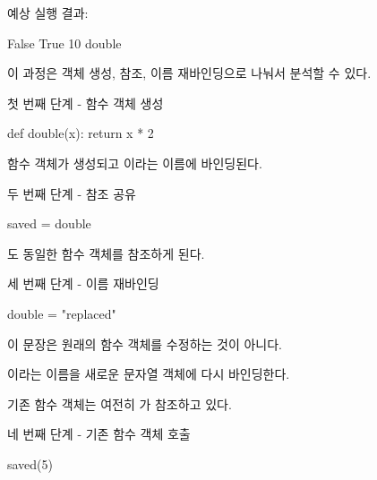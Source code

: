 예상 실행 결과:

\begin{dhkzsh}
False
True
10
double
\end{dhkzsh}

이 과정은 객체 생성, 참조, 이름 재바인딩으로 나눠서 분석할 수 있다.

\begin{dhknote}
\begin{dhksmry}[centered]
첫 번째 단계 - 함수 객체 생성
\end{dhksmry}
\end{dhknote}

\begin{dhkcode}
def double(x):
    return x * 2
\end{dhkcode}

함수 객체가 생성되고 이라는 이름에 바인딩된다.

\begin{dhknote}
\begin{dhksmry}[centered]
두 번째 단계 - 참조 공유
\end{dhksmry}
\end{dhknote}

\begin{dhkcode}
saved = double
\end{dhkcode}

도 동일한 함수 객체를 참조하게 된다.

\begin{dhknote}
\begin{dhksmry}[centered]
세 번째 단계 - 이름 재바인딩
\end{dhksmry}
\end{dhknote}

\begin{dhkcode}
double = "replaced"
\end{dhkcode}

이 문장은 원래의 함수 객체를 수정하는 것이 아니다.

이라는 이름을 새로운 문자열 객체에 다시 바인딩한다.

기존 함수 객체는 여전히 가 참조하고 있다.

\begin{dhknote}
\begin{dhksmry}[centered]
네 번째 단계 - 기존 함수 객체 호출
\end{dhksmry}
\end{dhknote}

\begin{dhkcode}
saved(5)
\end{dhkcode}

